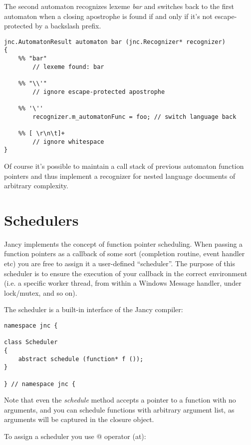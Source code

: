 \documentclass[oneside]{book}
\begin{document}
The second automaton recognizes lexeme \emph{bar} and switches back to the first automaton when a closing apostrophe is found if and only if it's not escape-protected by a backslash prefix.

\begin{lstlisting}
jnc.AutomatonResult automaton bar (jnc.Recognizer* recognizer)
{
    %% "bar"
        // lexeme found: bar

    %% "\\'"
        // ignore escape-protected apostrophe

    %% '\''
        recognizer.m_automatonFunc = foo; // switch language back

    %% [ \r\n\t]+
        // ignore whitespace
}
\end{lstlisting}

Of course it's possible to maintain a call stack of previous automaton function pointers and thus implement a recognizer for nested language documents of arbitrary complexity.

\section{Schedulers}

Jancy implements the concept of function pointer scheduling. When passing a function pointers as a callback of some sort (completion routine, event handler etc) you are free to assign it a user-defined “scheduler”. The purpose of this scheduler is to ensure the execution of your callback in the correct environment (i.e. a specific worker thread, from within a Windows Message handler, under lock/mutex, and so on).

The scheduler is a built-in interface of the Jancy compiler:

\begin{lstlisting}
namespace jnc {

class Scheduler
{
    abstract schedule (function* f ());
}

} // namespace jnc {
\end{lstlisting}

Note that even the \emph{schedule} method accepts a pointer to a function with no arguments, and you can schedule functions with arbitrary argument list, as arguments will be captured in the closure object.

To assign a scheduler you use @ operator (at):
\end{document}

